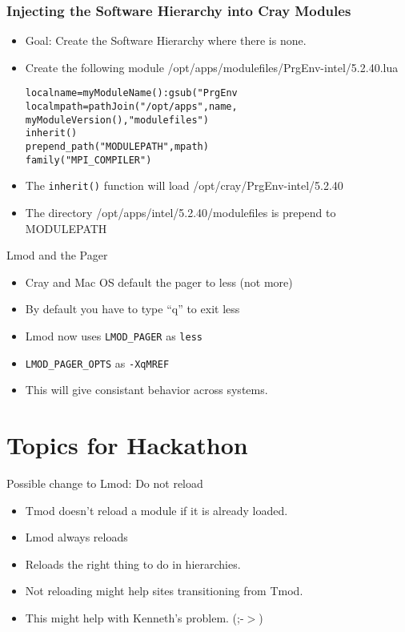 \documentclass{beamer}
\begin{document}
\begin{frame}[fragile]
    \frametitle{Injecting the Software Hierarchy into Cray Modules}
  \begin{itemize}
    \item Goal: Create the Software Hierarchy where there is none.
    \item Create the following module /opt/apps/modulefiles/PrgEnv-intel/5.2.40.lua
  {\small
    \begin{alltt}

local name = myModuleName():gsub("PrgEnv%-","")
local mpath = pathJoin("/opt/apps",name,
              myModuleVersion(),"modulefiles")
inherit()
prepend_path("MODULEPATH",mpath)
family("MPI_COMPILER")
    \end{alltt}
}
    \item The \texttt{inherit()} function will load /opt/cray/PrgEnv-intel/5.2.40
    \item The directory /opt/apps/intel/5.2.40/modulefiles is prepend
      to MODULEPATH       
  \end{itemize}
\end{frame}

\begin{frame}{Lmod and the Pager}
  \begin{itemize}
    \item Cray and Mac OS default the pager to less (not more)
    \item By default you have to type ``q'' to exit less
    \item Lmod now uses \texttt{LMOD\_PAGER} as \texttt{less}
    \item \texttt{LMOD\_PAGER\_OPTS} as \texttt{-XqMREF}
    \item This will give consistant behavior across systems.
  \end{itemize}
\end{frame}


\section{Topics for Hackathon}

\begin{frame}{Possible change to Lmod: Do not reload}
  \begin{itemize}
    \item Tmod doesn't reload a module if it is already loaded.
    \item Lmod always reloads
    \item Reloads the right thing to do in hierarchies.
    \item Not reloading might help sites transitioning from Tmod.
    \item This might help with Kenneth's problem. (;-$>$)
  \end{itemize}
\end{frame}
\end{document}
